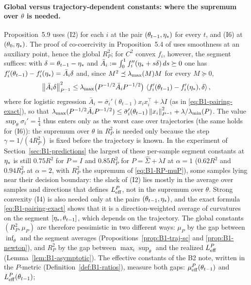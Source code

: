 \paragraph{Global versus trajectory-dependent constants: where the supremum over $\theta$ is needed.}
Proposition~5.9 uses (I2) for each $i$ at the pair $(\theta_{t-1},\eta_\ast)$ for every $t$, and (I6) at
$(\theta_0,\eta_\ast)$. The proof of co-coercivity in Proposition~5.4 of \cite{bach2024learning} uses
smoothness at an auxiliary point, hence the global $R_P^2$; for $C^2$ convex $f_i$, however, the segment
suffices: with $\delta=\theta_{t-1}-\eta_\ast$ and $\bar A_i:=\int_0^1f_i''(\eta_\ast+s\delta)\,ds\succeq0$ one has
$f'_i(\theta_{t-1})-f'_i(\eta_\ast)=\bar A_i\delta$ and, since $M^2\preceq\lambda_{\max}(M)M$ for every $M\succeq0$,
\[
\left\|\bar A_i\delta\right\|_{P^{-1}}^2\le\lambda_{\max}\big(P^{-1/2}\bar A_iP^{-1/2}\big)\,
\left\langle f'_i(\theta_{t-1})-f'_i(\eta_\ast), \delta \right\rangle,
\]
where for logistic regression $\bar A_i=\bar\sigma_i'(\theta_{t-1})x_ix_i^\top+\lambda I$ (as in
\eqref{eq:B1-pairing-exact}), so that
$\lambda_{\max}(P^{-1/2}\bar A_iP^{-1/2})\le\bar\sigma_i'(\theta_{t-1})\left\|x_i\right\|_{P^{-1}}^2+\lambda/\lambda_{\min}(P)$. The value
$\sup_\theta\sigma_i'=\frac14$ thus enters only as the worst case over trajectories (the same holds for (I6)):
the supremum over $\theta$ in $R_P^2$ is needed only because the step $\gamma=1/(4R_P^2)$ is fixed before the
trajectory is known. In the experiment of Section~\ref{sec:B1-predictions} the largest of these per-sample
segment constants at $\eta_\ast$ is still $0.75R^2$ for $P=I$ and $0.85R_P^2$ for $P=\hat\Sigma+\lambda I$ at
$\alpha=1$ ($0.62R^2$ and $0.94R_P^2$ at $\alpha=2$, with $R_P^2$ the supremum of \eqref{eq:B1-RP-muP}), some
samples lying near their decision boundary: the slack of (I2) lies mostly in the average over samples and
directions that defines $L_{\mathrm{eff}}^P$, not in the supremum over $\theta$. Strong convexity (I4) is also needed
only at the pairs $(\theta_{t-1},\eta_\ast)$, and the exact formula \eqref{eq:B1-pairing-exact} shows that it
is a direction-weighted average of curvatures on the segment $[\eta_\ast,\theta_{t-1}]$, which depends on
the trajectory. The global constants $(R_P^2,\mu_P)$ are therefore pessimistic in two different ways:
$\mu_P$ by the gap between $\inf_\theta$ and the segment averages (Propositions~\ref{prop:B1-traj-sc} and
\ref{prop:B1-newton}), and $R_P^2$ by the gap between $\max_i\sup_\theta$ and the realized $L_{\mathrm{eff}}^P$
(Lemma~\ref{lem:B1-asymptotic}). The effective constants of the B2 note, written in the $P$-metric
(Definition~\ref{def:B1-ratios}), measure both gaps: $\mu_{\mathrm{eff}}^P(\theta_{t-1})$ and $L_{\mathrm{eff}}^P(\theta_{t-1})$;
